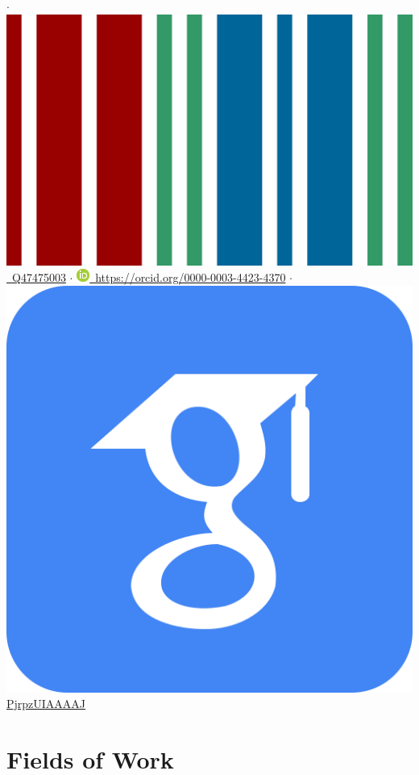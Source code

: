 \documentclass[11pt,a4paper,sans]{moderncv} %
\begin{document}
    $\cdot$\href{https://bioregistry.io/wikidata:Q47475003}{\includegraphics[scale=0.01]{img/wikidata_logo}\ Q47475003}
$\cdot$
\href{https://orcid.org/0000-0003-4423-4370}{\includegraphics[scale=0.5]{img/ORCIDiD_icon16x16}\ https://orcid.org/0000-0003-4423-4370}
$\cdot$
\href{https://scholar.google.com/citations?user=PjrpzUIAAAAJ}{\includegraphics[scale=0.015625]{img/google_scholar_icon_130918} PjrpzUIAAAAJ}

\section{Fields of Work}\label{sec:fields}
\end{document}
